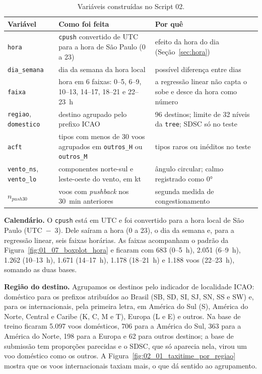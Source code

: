 \documentclass[12pt,a4paper]{article}
\begin{document}
\begin{table}[H]\centering\scriptsize
\caption{Variáveis construídas no Script 02.}\label{tab:features}
\begin{tabular}{p{2.6cm}p{5.6cm}p{5.8cm}}
\toprule
Variável & Como foi feita & Por quê\\
\midrule
\texttt{hora} & \texttt{cpush} convertido de UTC para a hora de São Paulo (0 a 23) & efeito da hora do dia (Seção~\ref{sec:hora})\\
\texttt{dia\_semana} & dia da semana da hora local & possível diferença entre dias\\
\texttt{faixa} & hora em 6 faixas: 0--5, 6--9, 10--13, 14--17, 18--21 e 22--23~h & a regressão linear não capta o sobe e desce da hora como número\\
\texttt{regiao}, \texttt{domestico} & destino agrupado pelo prefixo ICAO & 96 destinos; limite de 32 níveis da \texttt{tree}; SDSC só no teste\\
\texttt{acft} & tipos com menos de 30 voos agrupados em \texttt{outros\_H} ou \texttt{outros\_M} & tipos raros ou inéditos no teste\\
\texttt{vento\_ns}, \texttt{vento\_lo} & componentes norte-sul e leste-oeste do vento, em kt & ângulo circular; calmo registrado como 0°\\
$n_{push30}$ & voos com \textit{pushback} nos 30~min anteriores & segunda medida de congestionamento\\
\bottomrule
\end{tabular}
\end{table}

\textbf{Calendário.} O \texttt{cpush} está em UTC e foi convertido para a hora local de São Paulo (UTC~$-$~3). Dele saíram a hora (0 a 23), o dia da semana e, para a regressão linear, seis faixas horárias. As faixas acompanham o padrão da Figura~\ref{fig:01_07_boxplot_hora} e ficaram com 683 (0--5~h), 2.051 (6--9~h), 1.262 (10--13~h), 1.671 (14--17~h), 1.178 (18--21~h) e 1.188 voos (22--23~h), somando as duas bases.

\textbf{Região do destino.} Agrupamos os destinos pelo indicador de localidade ICAO: doméstico para os prefixos atribuídos ao Brasil (SB, SD, SI, SJ, SN, SS e SW) e, para os internacionais, pela primeira letra, em América do Sul (S), América do Norte, Central e Caribe (K, C, M e T), Europa (L e E) e outros. Na base de treino ficaram 5.097 voos domésticos, 706 para a América do Sul, 363 para a América do Norte, 198 para a Europa e 62 para outros destinos; a base de submissão tem proporções parecidas e o SDSC, que só aparecia nela, virou um voo doméstico como os outros. A Figura~\ref{fig:02_01_taxitime_por_regiao} mostra que os voos internacionais taxiam mais, o que dá sentido ao agrupamento.
\end{document}
